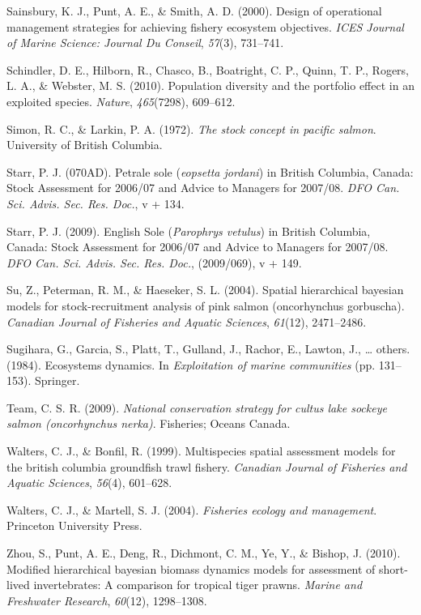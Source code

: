 \documentclass[12pt,]{scrartcl}
\begin{document}
\hypertarget{ref-sainsbury2000design}{}
Sainsbury, K. J., Punt, A. E., \& Smith, A. D. (2000). Design of
operational management strategies for achieving fishery ecosystem
objectives. \emph{ICES Journal of Marine Science: Journal Du Conseil},
\emph{57}(3), 731--741.

\hypertarget{ref-schindler2010population}{}
Schindler, D. E., Hilborn, R., Chasco, B., Boatright, C. P., Quinn, T.
P., Rogers, L. A., \& Webster, M. S. (2010). Population diversity and
the portfolio effect in an exploited species. \emph{Nature},
\emph{465}(7298), 609--612.

\hypertarget{ref-simon1972stock}{}
Simon, R. C., \& Larkin, P. A. (1972). \emph{The stock concept in
pacific salmon}. University of British Columbia.

\hypertarget{ref-starr2009petrale-so}{}
Starr, P. J. (070AD). Petrale sole (\emph{eopsetta jordani}) in British
Columbia, Canada: Stock Assessment for 2006/07 and Advice to Managers
for 2007/08. \emph{DFO Can. Sci. Advis. Sec. Res. Doc.}, v + 134.

\hypertarget{ref-starr2009english-so}{}
Starr, P. J. (2009). English Sole (\emph{Parophrys vetulus}) in British
Columbia, Canada: Stock Assessment for 2006/07 and Advice to Managers
for 2007/08. \emph{DFO Can. Sci. Advis. Sec. Res. Doc.}, (2009/069), v +
149.

\hypertarget{ref-su2004spatial}{}
Su, Z., Peterman, R. M., \& Haeseker, S. L. (2004). Spatial hierarchical
bayesian models for stock-recruitment analysis of pink salmon
(oncorhynchus gorbuscha). \emph{Canadian Journal of Fisheries and
Aquatic Sciences}, \emph{61}(12), 2471--2486.

\hypertarget{ref-sugihara1984ecosystems}{}
Sugihara, G., Garcia, S., Platt, T., Gulland, J., Rachor, E., Lawton,
J., \ldots{} others. (1984). Ecosystems dynamics. In \emph{Exploitation
of marine communities} (pp. 131--153). Springer.

\hypertarget{ref-team2009national}{}
Team, C. S. R. (2009). \emph{National conservation strategy for cultus
lake sockeye salmon (oncorhynchus nerka)}. Fisheries; Oceans Canada.

\hypertarget{ref-walters1999multispecies}{}
Walters, C. J., \& Bonfil, R. (1999). Multispecies spatial assessment
models for the british columbia groundfish trawl fishery. \emph{Canadian
Journal of Fisheries and Aquatic Sciences}, \emph{56}(4), 601--628.

\hypertarget{ref-walters2004fisheries}{}
Walters, C. J., \& Martell, S. J. (2004). \emph{Fisheries ecology and
management}. Princeton University Press.

\hypertarget{ref-zhou2010modified}{}
Zhou, S., Punt, A. E., Deng, R., Dichmont, C. M., Ye, Y., \& Bishop, J.
(2010). Modified hierarchical bayesian biomass dynamics models for
assessment of short-lived invertebrates: A comparison for tropical tiger
prawns. \emph{Marine and Freshwater Research}, \emph{60}(12),
1298--1308.
\end{document}
